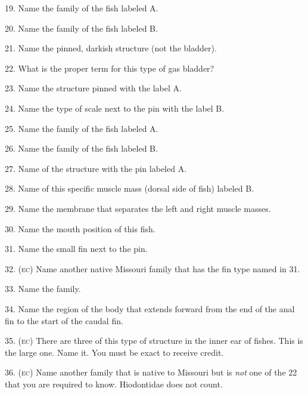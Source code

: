 \documentclass{article}
\begin{document}
{19. Name the family of the fish labeled A.
\vspace{1\baselineskip}

20. Name the family of the fish labeled B.
\vspace{2\baselineskip}
%


21. Name the pinned, darkish structure (not the bladder). 
\vspace{1\baselineskip}

22. What is the proper term for this type of gas bladder?
\vspace{2\baselineskip}
%


23. Name the structure pinned with the label A.
\vspace{1\baselineskip}

24. Name the type of scale next to the pin with the label B.
\vspace{2\baselineskip}
%


25. Name the family of the fish labeled A.
\vspace{1\baselineskip}

26. Name the family of the fish labeled B.
\vspace{2\baselineskip}
%

27. Name of the structure with the pin labeled A.
\vspace{1\baselineskip}

28. Name of this specific muscle mass (dorsal side of fish) labeled B.
\vspace{1\baselineskip}

29. Name the membrane that separates the left and right muscle masses.
\vspace{2\baselineskip}

%
30. Name the mouth position of this fish.
\vspace{1\baselineskip}

31. Name the small fin next to the pin.
\vspace{1\baselineskip}

32. \textsc{(ec)} Name another native Missouri family that has the fin type named in 31.
\vspace{2\baselineskip}
%
\newpage


33. Name the family.
\vspace{1\baselineskip}

34. Name the region of the body that extends forward from the end of the anal fin to the start of the caudal fin.
\vspace{1\baselineskip}
%

35. \textsc{(ec)} There are three of this type of structure in the inner ear of fishes.  This is the large one.  Name it. You must be exact to receive credit.
\vspace{1\baselineskip}

36. \textsc{(ec)} Name another family that is native to Missouri but is \textit{not} one of the 22 that you are required to know.  Hiodontidae does not count.
\vspace{2\baselineskip}

}%
\end{document}

